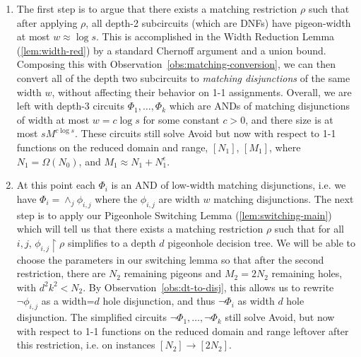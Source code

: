 \documentclass[11pt]{article}
\begin{document}
\begin{enumerate}

 \item The first step is to argue that there exists a matching restriction $\rho$ such that after applying $\rho$, all depth-2 subcircuits (which are DNFs) have pigeon-width at most $w \approx \log s$. This is accomplished in the Width Reduction Lemma (\ref{lem:width-red}) by a standard Chernoff argument and a union bound. Composing this with Observation~\ref{obs:matching-conversion}, we can then convert all of the depth two subcircuits to \emph{matching disjunctions} of the same width $w$, without affecting their behavior on 1-1 assignments. Overall, we are left with depth-3 circuits $\Phi_1,\ldots,\Phi_k$ which are ANDs of matching disjunctions of width at most $w = c \log s$ for some constant $c>0$, and there size is at most $s M^{c \log s}$.
 These circuits still solve Avoid but now with respect to 1-1 functions on the reduced domain and range, $[N_1]$, $[M_1]$,  where $N_1 =\Omega(N_0)$, and $M_1 \approx N_1 + N_1^{\epsilon}$.
 \item At this point each $\Phi_i$ is an AND of low-width matching disjunctions, i.e. we have $\Phi_i = \land_j \phi_{i,j}$ where the $\phi_{i,j}$ are width $w$ matching disjunctions. The next step is to apply our Pigeonhole Switching Lemma (\ref{lem:switching-main}) which will tell us that there exists a matching restriction $\rho$ such that for all $i,j$,  $\phi_{i,j}\upharpoonright\rho$ simplifies to a depth $d$ pigeonhole decision tree. We will be able to choose the parameters in our switching lemma so that after the second restriction, there are $N_2$ remaining pigeons and $M_2= 2N_2$ remaining holes, with $d^2k^2 < N_2$. By Observation~\ref{obs:dt-to-disj}, this allows us to rewrite $\lnot \phi_{i,j}$ as a width=$d$ hole disjunction, and thus $\lnot \Phi_i$ as width $d$ hole disjunction. The simplified circuits $\lnot \Phi_1,\ldots, \lnot \Phi_k$ still solve Avoid, but now with respect to 1-1 functions on the reduced domain and range leftover after this restriction, i.e. on instances $[N_2] \to [2N_2]$.
 

\end{enumerate}
\end{document}
